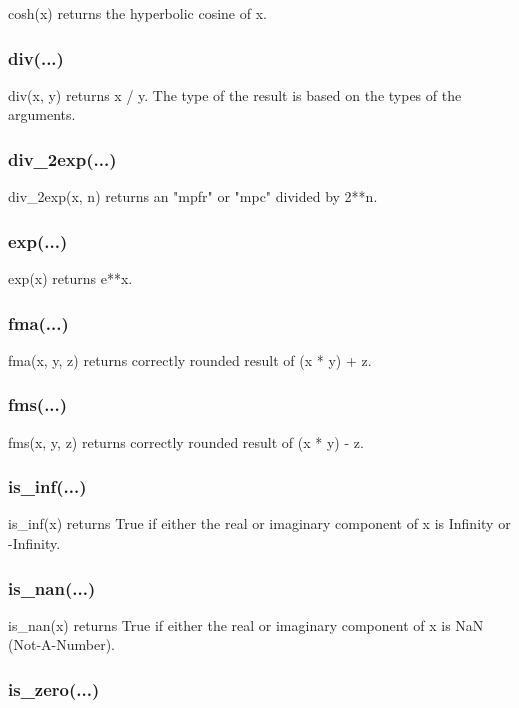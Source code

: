 cosh(x) returns the hyperbolic cosine of x.

\subsubsection{div(...)}

div(x, y) returns x / y. The type of the result is based on the types of the arguments.

\subsubsection{div\_2exp(...)}

div\_2exp(x, n) returns an "mpfr" or "mpc" divided by 2**n.

\subsubsection{exp(...)}

exp(x) returns e**x.

\subsubsection{fma(...)}

fma(x, y, z) returns correctly rounded result of (x * y) + z.

\subsubsection{fms(...)}

fms(x, y, z) returns correctly rounded result of (x * y) - z.

\subsubsection{is\_inf(...)}

is\_inf(x) returns True if either the real or imaginary component of x is Infinity or -Infinity.

\subsubsection{is\_nan(...)}

is\_nan(x) returns True if either the real or imaginary component of x is NaN (Not-A-Number).

\subsubsection{is\_zero(...)}

